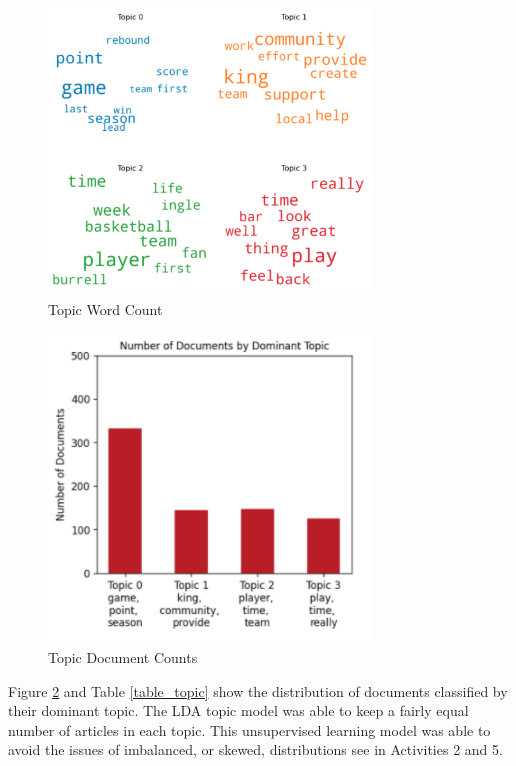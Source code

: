 \documentclass[5p,authoryear]{elsarticle}
\begin{document}



\begin{figure}[!htb] \centering
	\includegraphics[width=3.4in]{figures/word_cloud.png}
	\caption[]{Topic Word Count} 
	\label{cloud} 
\end{figure}



\begin{figure}[!htb] \centering
	\includegraphics[width=3.4in]{figures/topic_doc_count.png}
	\caption[]{Topic Document Counts} 
	\label{counts} 
\end{figure}


Figure \ref{counts} and Table \ref{table_topic} show the distribution of documents classified by their dominant topic. 
The LDA topic model was able to keep a fairly equal number of articles in each topic.
This unsupervised learning model was able to avoid the issues of imbalanced, or skewed, distributions see in Activities 2 and 5.
\end{document}
